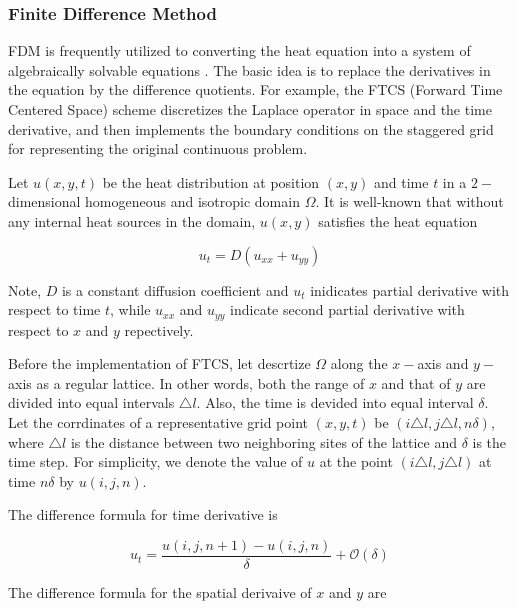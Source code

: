 \subsubsection{Finite Difference Method}

FDM is frequently utilized to converting the heat equation into a
system of algebraically solvable equations
\cite{grossmann2007numerical}. The basic idea is to replace the
derivatives in the equation by the difference quotients. For example,
the FTCS (Forward Time Centered Space) scheme
\cite{pletcher2012computational} discretizes the Laplace operator in
space and the time derivative, and then implements the boundary
conditions on the staggered grid for representing the original
continuous problem.


Let $u(x, y, t)$ be the heat distribution at position $(x, y)$ and
time $t$ in a $2-$dimensional homogeneous and isotropic domain $\Omega$. It is
well-known that without any internal heat sources in the domain, $u(x,
y)$ satisfies the heat equation

\begin{equation}\label{eq:Cartesian_heat_equation}
  u_t = D (u_{xx} + u_{yy})
\end{equation}

Note, $D$ is a constant diffusion coefficient and $u_t$ inidicates
partial derivative with respect to time $t$, while $u_{xx}$ and
$u_{yy}$ indicate second partial derivative with respect to $x$ and
$y$ repectively.

Before the implementation of FTCS, let descrtize $\Omega$ along the
$x-$axis and $y-$axis as a regular lattice. In other words, both the
range of $x$ and that of $y$ are divided into equal intervals
$\triangle l$. Also, the time is devided into equal interval
$\delta$. Let the corrdinates of a representative grid point $(x, y,
t)$ be $(i \triangle l, j \triangle l, n \delta)$, where $\triangle l$
is the distance between two neighboring sites of the lattice and
$\delta$ is the time step. For simplicity, we denote the value of $u$
at the point $(i \triangle l, j \triangle l)$ at time $n \delta$ by
$u(i, j, n)$.

The difference formula for time derivative is

\begin{equation}\label{eq:time_difference}
  u_t = \frac{u(i, j, n+1) - u(i, j, n)}{\delta} + \mathcal{O}(\delta)
\end{equation}

The difference formula for the spatial derivaive of $x$ and $y$ are


